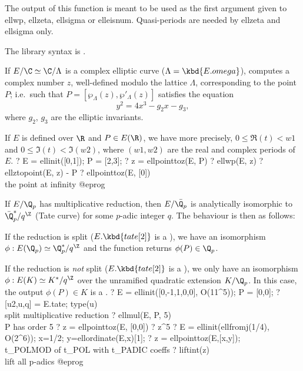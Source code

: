 The output of this function is meant to be used as the first argument
given to ellwp, ellzeta, ellsigma or elleisnum. Quasi-periods are
needed by ellzeta and ellsigma only.

The library syntax is .

\label{se:ellpointtoz}
If $E/\C \simeq \C/\Lambda$ is a complex elliptic curve ($\Lambda =
\kbd{E.omega}$),
computes a complex number $z$, well-defined modulo the lattice $\Lambda$,
corresponding to the point $P$; i.e.~such that
 $P = [\wp_\Lambda(z),\wp'_\Lambda(z)]$
satisfies the equation
$$y^2 = 4x^3 - g_2 x - g_3,$$
where $g_2$, $g_3$ are the elliptic invariants.

If $E$ is defined over $\R$ and $P\in E(\R)$, we have more precisely, $0 \leq
\Re(t) < w1$ and $0 \leq \Im(t) < \Im(w2)$, where $(w1,w2)$ are the real and
complex periods of $E$.
\bprog
? E = ellinit([0,1]); P = [2,3];
? z = ellpointtoz(E, P)
? ellwp(E, z)
? ellztopoint(E, z) - P
? ellpointtoz(E, [0]) \\ the point at infinity
@eprog

If $E/\Q_p$ has multiplicative reduction, then $E/\bar{\Q_p}$ is analytically
isomorphic to $\bar{\Q}_p^*/q^\Z$ (Tate curve) for some $p$-adic integer $q$.
The behaviour is then as follows:

\item If the reduction is split ($E.\kbd{tate[2]}$ is a ), we have
an isomorphism $\phi: E(\Q_p) \simeq \Q_p^*/q^\Z$ and the function returns
$\phi(P)\in \Q_p$.

\item If the reduction is \emph{not} split ($E.\kbd{tate[2]}$ is a
), we only have an isomorphism $\phi: E(K) \simeq K^*/q^\Z$ over
the unramified quadratic extension $K/\Q_p$. In this case, the output
$\phi(P)\in K$ is a .
\bprog
? E = ellinit([0,-1,1,0,0], O(11^5)); P = [0,0];
? [u2,u,q] = E.tate; type(u) \\ split multiplicative reduction
? ellmul(E, P, 5)  \\ P has order 5
? z = ellpointtoz(E, [0,0])
? z^5
? E = ellinit(ellfromj(1/4), O(2^6)); x=1/2; y=ellordinate(E,x)[1];
? z = ellpointtoz(E,[x,y]); \\ t_POLMOD of t_POL with t_PADIC coeffs
? liftint(z) \\ lift all p-adics
@eprog

